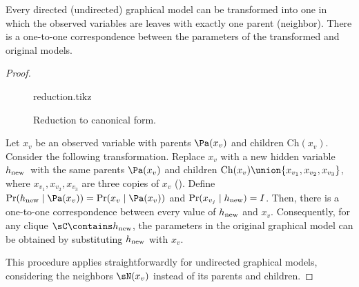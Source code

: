 \begin{lemma}
  \label{lem:reduction}
Every directed (undirected) graphical model can be transformed into one in which
  the observed variables are leaves with exactly one parent (neighbor). 
There is a one-to-one correspondence between the parameters of the
  transformed and original models.
\end{lemma}
\begin{proof}
  \begin{figure}
    \centering
    {reduction.tikz}
    \caption{Reduction to canonical form.}
    \label{fig:reduction}
  \end{figure}

  \providecommand{\hp}{\ensuremath{h_\text{\rm new}}}
  Let $x_v$ be an observed variable with parents $\Pa(x_v)$ and children $\text{Ch}(x_v)$.
  Consider the following transformation.
  Replace $x_v$ with a new hidden variable \hp\ with the same
  parents $\Pa(x_v)$ and children $\text{Ch}(x_v) \union \{x_{v_1}, x_{v_2}, x_{v_3}\}$,
  where $x_{v_1},x_{v_2},x_{v_3}$ are three copies of $x_v$
  ().
  Define $\Pr(\hp \mid \Pa(x_v)) = \Pr(x_v \mid \Pa(x_v))$ and
  $\Pr(x_{v_j} \mid \hp) = I$.
  Then, there is a one-to-one correspondence between every value of
  $\hp$ and $x_v$. Consequently, for any clique $\sC \contains \hp$, the
  parameters in the original graphical model can be obtained by
  substituting $\hp$ with $x_v$.

  This procedure applies straightforwardly for undirected graphical
  models, considering the neighbors $\sN(x_v)$ instead of its parents
  and children.
\end{proof}

